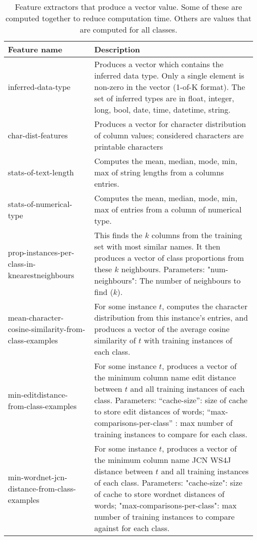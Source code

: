 \documentclass[letterpaper]{article} %
\begin{document}
\begin{table}[t]
	\centering
	\caption{Feature extractors that produce a vector value. Some of these are computed together to reduce computation time.
	Others are values that are computed for all classes.}
	
	\begin{tabular}{p{2.5cm}p{5cm}}
	Feature name & Description \\ \hline
inferred-data-type      & Produces a vector which contains the inferred data type.  
Only a single element is non-zero in the vector (1-of-K format).  
The set of inferred types are in float, integer, long, bool, date, time, datetime, string. \\
	\rowcolor{Gray}
char-dist-features      & Produces a vector for character distribution of column values;
considered characters are printable characters
\\
stats-of-text-length    & Computes the mean, median, mode, min, max of string lengths from a columns entries.\\
	\rowcolor{Gray}
stats-of-numerical-type & Computes the mean, median, mode, min, max of entries from a column of numerical type.\\

prop-instances-per-class-in-knearestneighbours         & This finds the $k$ columns from the training set with most similar names.
It then produces a vector of class proportions from these $k$ neighbours.
Parameters:
"num-neighbours": The number of neighbours to find ($k$).\\
	\rowcolor{Gray}
mean-character-cosine-similarity-from-class-examples   & For some instance $t$, computes the character distribution 
from this instance's entries, and produces a vector of the average
cosine similarity of $t$ with training instances of each class.\\
min-editdistance-from-class-examples                   & For some instance $t$, produces a vector of the minimum column name
edit distance between $t$ and all training instances of each class.
Parameters:
``cache-size'': size of cache to store edit distances of words;
``max-comparisons-per-class'' : max number of training instances to compare for each class.\\

	\rowcolor{Gray}
min-wordnet-jcn-distance-from-class-examples            & For some instance $t$, produces a vector of the minimum column name
JCN WS4J distance between $t$ and all training instances of each class.
Parameters:
"cache-size": size of cache to store wordnet distances of words; 
"max-comparisons-per-class": max number of training instances to compare
against for each class.\\


\end{tabular}
\end{table}
\end{document}

